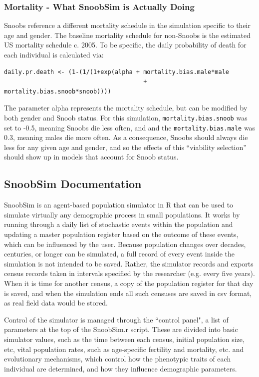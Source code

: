 \subsubsection{Mortality - What SnoobSim is Actually Doing}

Snoobs reference a different mortality schedule in the simulation specific to their age and gender.  The baseline mortality schedule for non-Snoobs is the estimated US mortality schedule c. 2005.  To be specific, the daily probability of death for each individual is calculated via:

\begin{verbatim}
daily.pr.death <- (1-(1/(1+exp(alpha + mortality.bias.male*male 
                                       + mortality.bias.snoob*snoob))))
\end{verbatim}

The parameter alpha represents the mortality schedule, but can be modified by both gender and Snoob status.  For this simulation, \texttt{mortality.bias.snoob} was set to -0.5, meaning Snoobs die less often, and and the \texttt{mortality.bias.male} was 0.3, meaning males die more often.  As a consequence, Snoobs should always die less for any given age and gender, and so the effects of this ``viability selection'' should show up in models that account for Snoob status.  



\subsection{SnoobSim Documentation}

SnoobSim is an agent-based population simulator in R that can be used to simulate virtually any demographic process in small populations.  It works by running through a daily list of stochastic events within the population and updating a master population register based on the outcome of these events, which can be influenced by the user.  Because population changes over decades, centuries, or longer can be simulated, a full record of every event inside the simulation is not intended to be saved.  Rather, the simulator records and exports census records taken in intervals specified by the researcher (e.g. every five years).  When it is time for another census, a copy of the population register for that day is saved, and when the simulation ends all such censuses are saved in csv format, as real field data would be stored.
  
Control of the simulator is managed through the ``control panel", a list of parameters at the top of the SnoobSim.r script.  These are divided into basic simulator values, such as the time between each census, initial population size, etc, vital population rates, such as age-specific fertility and mortality, etc. and evolutionary mechanisms, which control how the phenotypic traits of each individual are determined, and how they influence demographic parameters.  

